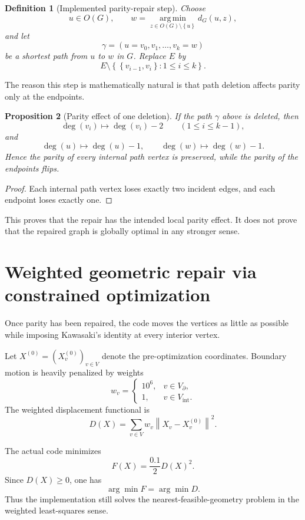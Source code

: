 \documentclass[11pt]{article}
\newtheorem{definition}{Definition}[section]
\newtheorem{proposition}[definition]{Proposition}
\theoremstyle{remark}
\newcommand{\norm}[1]{\left\lVert #1 \right\rVert}
\newcommand{\set}[1]{\left\{ #1 \right\}}
\begin{document}
\begin{definition}[Implemented parity-repair step]
Choose
\[
u\in O(G),
\qquad
w=\operatorname*{arg\,min}_{z\in O(G)\setminus\set{u}} d_G(u,z),
\]
and let
\[
\gamma=(u=v_0,v_1,\dots,v_k=w)
\]
be a shortest path from $u$ to $w$ in $G$. Replace $E$ by
\[
E\setminus \set{\set{v_{i-1},v_i}:1\le i\le k}.
\]
\end{definition}

The reason this step is mathematically natural is that path deletion affects
parity only at the endpoints.

\begin{proposition}[Parity effect of one deletion]
If the path $\gamma$ above is deleted, then
\[
\deg(v_i)\mapsto \deg(v_i)-2
\qquad (1\le i\le k-1),
\]
and
\[
\deg(u)\mapsto \deg(u)-1,
\qquad
\deg(w)\mapsto \deg(w)-1.
\]
Hence the parity of every internal path vertex is preserved, while the parity
of the endpoints flips.
\end{proposition}

\begin{proof}
Each internal path vertex loses exactly two incident edges, and each endpoint
loses exactly one.
\end{proof}

This proves that the repair has the intended local parity effect. It does not
prove that the repaired graph is globally optimal in any stronger sense.

\section{Weighted geometric repair via constrained optimization}

Once parity has been repaired, the code moves the vertices as little as possible
while imposing Kawasaki's identity at every interior vertex.

Let $X^{(0)}=(X_v^{(0)})_{v\in V}$ denote the pre-optimization coordinates.
Boundary motion is heavily penalized by weights
\[
w_v=
\begin{cases}
10^6,& v\in V_{\partial},\\
1,& v\in V_{\mathrm{int}}.
\end{cases}
\]
The weighted displacement functional is
\[
D(X)=\sum_{v\in V} w_v \norm{X_v-X_v^{(0)}}^2.
\]

The actual code minimizes
\[
F(X)=\frac{0.1}{2}D(X)^2.
\]
Since $D(X)\ge 0$, one has
\[
\arg\min F = \arg\min D.
\]
Thus the implementation still solves the nearest-feasible-geometry problem in
the weighted least-squares sense.
\end{document}
